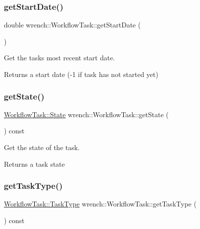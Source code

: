 \subsubsection{\texorpdfstring{get\+Start\+Date()}{getStartDate()}}
{\footnotesize\ttfamily double wrench\+::\+Workflow\+Task\+::get\+Start\+Date (\begin{DoxyParamCaption}{ }\end{DoxyParamCaption})}



Get the task\textquotesingle{}s most recent start date. 

\begin{DoxyReturn}{Returns}
a start date (-\/1 if task has not started yet) 
\end{DoxyReturn}
\mbox{\label{classwrench_1_1_workflow_task_a990a3e96d944c37cb896a7ca0d84a4db}} 
\subsubsection{\texorpdfstring{get\+State()}{getState()}}
{\footnotesize\ttfamily \hyperlink{classwrench_1_1_workflow_task_a1184f3d7aea21e1c87a9b17e84f1f92a}{Workflow\+Task\+::\+State} wrench\+::\+Workflow\+Task\+::get\+State (\begin{DoxyParamCaption}{ }\end{DoxyParamCaption}) const}



Get the state of the task. 

\begin{DoxyReturn}{Returns}
a task state 
\end{DoxyReturn}
\mbox{\label{classwrench_1_1_workflow_task_ac9ad03bc492dd9a827c43e13e079e08c}} 
\subsubsection{\texorpdfstring{get\+Task\+Type()}{getTaskType()}}
{\footnotesize\ttfamily \hyperlink{classwrench_1_1_workflow_task_a490a935259b9425a3e4fb011a86cb4bf}{Workflow\+Task\+::\+Task\+Type} wrench\+::\+Workflow\+Task\+::get\+Task\+Type (\begin{DoxyParamCaption}{ }\end{DoxyParamCaption}) const}



